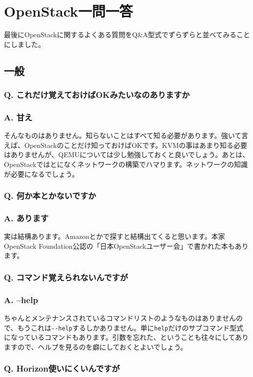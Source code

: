\documentclass[9pt,b5paper,tombo,openany]{jsbook}
\begin{document}
\chapter{OpenStack一問一答}

最後にOpenStackに関するよくある質問をQ\&A型式でずらずらと並べてみることにしました。

\section{一般}

\subsection*{Q. これだけ覚えておけばOKみたいなのありますか}
\subsection*{A. 甘え}
そんなものはありません。知らないことはすべて知る必要があります。強いて言えば、OpenStackのことだけ知っておけばOKです。KVMの事はあまり知る必要はありませんが、QEMUについては少し勉強しておくと良いでしょう。あとは、OpenStackではとになくネットワークの構築でハマります。ネットワークの知識が必要になるでしょう。

\subsection*{Q. 何か本とかないですか}
\subsection*{A. あります}
実は結構あります。Amazonとかで探すと結構出てくると思います。本家OpenStack Foundation公認の「日本OpenStackユーザー会」で書かれた本もあります。

\subsection*{Q. コマンド覚えられないんですが}
\subsection*{A. --help}
ちゃんとメンテナンスされているコマンドリストのようなものはありませんので、もうこれは\verb|--help|するしかありません。単に\verb|help|だけのサブコマンド型式になっているコマンドもあります。引数を忘れた、ということも往々にしてありますので、ヘルプを見るのを癖にしておくとよいでしょう。

\subsection*{Q. Horizon使いにくいんですが}
\end{document}
